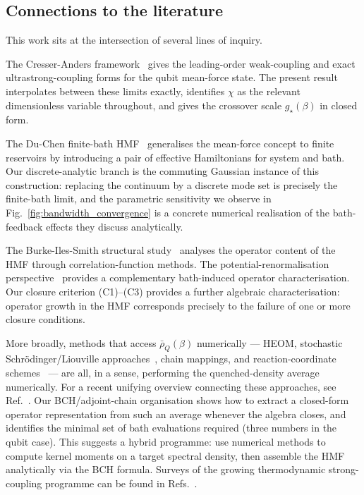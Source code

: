 \subsection*{Connections to the literature}

This work sits at the intersection of several lines of inquiry.

The Cresser-Anders framework~\cite{cresserWeakUltrastrongCoupling2021a,hovhannisyanHamiltonianMeanForce2020}
gives the leading-order weak-coupling and exact ultrastrong-coupling forms
for the qubit mean-force state.
The present result interpolates between these limits exactly, identifies
$\chi$ as the relevant dimensionless variable throughout, and gives the
crossover scale $g_\star(\beta)$ in closed form.

The Du-Chen finite-bath HMF~\cite{duGeneralizedHamiltonianMeanforce2025a}
generalises the mean-force concept to finite reservoirs by introducing
a pair of effective Hamiltonians for system and bath.
Our discrete-analytic branch is the commuting Gaussian instance of this
construction: replacing the continuum by a discrete mode set is precisely
the finite-bath limit, and the parametric sensitivity we observe in
Fig.~\ref{fig:bandwidth_convergence} is a concrete numerical realisation
of the bath-feedback effects they discuss analytically.

The Burke-Iles-Smith structural
study~\cite{burkeStructureHamiltonianMean2024} analyses the operator
content of the HMF through correlation-function methods.
The potential-renormalisation
perspective~\cite{correaPotentialRenormalisationLamb2025} provides a complementary
bath-induced operator characterisation.
Our closure criterion (C1)--(C3) provides a further algebraic
characterisation: operator growth in the HMF corresponds precisely to
the failure of one or more closure conditions.

More broadly, methods that access $\bar\rho_Q(\beta)$ numerically ---
HEOM, stochastic Schrödinger/Liouville
approaches~\cite{tanimuraReducedHierarchicalEquations2014,stockburgerSimulatingSpinbosonDynamics2004},
chain mappings, and reaction-coordinate schemes~\cite{nazirReactionCoordinateMapping2018,IlesSmithDijkstraLambertNazir2016,AntoSztrikacsNazirSegal2023,ShubrookIlesSmithNazir2025} --- are all,
in a sense, performing the quenched-density average numerically.
For a recent unifying overview connecting these approaches, see
Ref.~\cite{XuVadimovStockburgerAnkerhold2026}.
Our BCH/adjoint-chain organisation shows how to extract a closed-form
operator representation from such an average whenever the algebra
closes, and identifies the minimal set of bath evaluations required
(three numbers in the qubit case).
This suggests a hybrid programme: use numerical methods to compute kernel
moments on a target spectral density, then assemble the HMF analytically
via the BCH formula.
Surveys of the growing thermodynamic strong-coupling programme can be found
in Refs.~\cite{campbellRoadmapQuantumThermodynamics2026,binderThermodynamicsQuantumRegime2018}.

